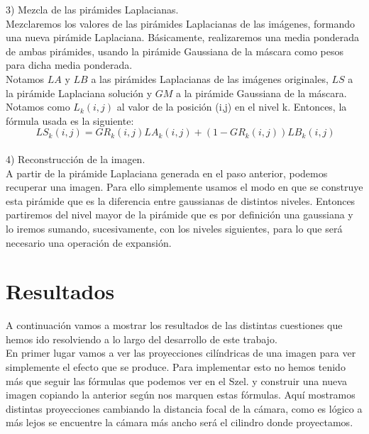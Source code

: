 \documentclass[10pt,a4paper]{article}
\theoremstyle{definition}
\begin{document}
3) Mezcla de las pirámides Laplacianas.\\

Mezclaremos los valores de las pirámides Laplacianas de las imágenes, formando una nueva pirámide Laplaciana. Básicamente, realizaremos una media ponderada de ambas pirámides, usando la pirámide Gaussiana de la máscara como pesos para dicha media ponderada. \\

Notamos $LA$ y $LB$ a las pirámides Laplacianas de las imágenes originales, $LS$ a la pirámide Laplaciana solución y $GM$ a la pirámide Gaussiana de la máscara. Notamos como $L_{k}(i,j)$ al valor de la posición (i,j) en el nivel k. Entonces, la fórmula usada es la siguiente:\\

\[
\ LS_{k}(i,j) = GR_{k}(i,j)LA_{k}(i,j) + (1-GR_{k}(i,j))LB_{k}(i,j)
\]\\

4) Reconstrucción de la imagen.\\

A partir de la pirámide Laplaciana generada en el paso anterior, podemos recuperar una imagen. Para ello simplemente usamos el modo en que se construye esta pirámide que es la diferencia entre gaussianas de distintos niveles. Entonces partiremos del nivel mayor de la pirámide que es por definición una gaussiana y lo iremos sumando, sucesivamente, con los niveles siguientes, para lo que será necesario una operación de expansión.\\

\section{Resultados}

A continuación vamos a mostrar los resultados de las distintas cuestiones que hemos ido resolviendo a lo largo del desarrollo de este trabajo.\\

En primer lugar vamos a ver las proyecciones cilíndricas de una imagen para ver simplemente el efecto que se produce. Para implementar esto no hemos tenido más que seguir las fórmulas que podemos ver en el Szel. y construir una nueva imagen copiando la anterior según nos marquen estas fórmulas. Aquí mostramos distintas proyecciones cambiando la distancia focal de la cámara, como es lógico a más lejos se encuentre la cámara más ancho será el cilindro donde proyectamos.\\
\end{document}
